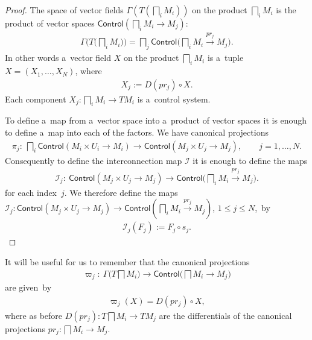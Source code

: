 \documentclass[pdftex]{sigma}
\numberwithin{equation}{section}
\begin{document}
\begin{proof}
The space of vector f\/ields $\Gamma \left(T\left(\bigsqcap_i M_i\right)\right)$ on the product $\bigsqcap_i M_i$ is the product of vector
spaces $\mathsf{Control} (\bigsqcap_i M_i \to M_j)$:
\begin{gather*}
\Gamma \bigg(T\bigg(\bigsqcap_i M_i\bigg)\bigg) = \bigsqcap_j \mathsf{Control} \bigg(\bigsqcap_i M_i \xrightarrow{pr_j}M_j\bigg).
\end{gather*}
In other words a~vector f\/ield $X $ on the product $\bigsqcap_i M_i$ is a~tuple $X = (X_1, \ldots, X_N)$, where
\begin{gather*}
X_j:= D (pr_j)\circ X.
\end{gather*}
Each component $X_j \colon \bigsqcap_i M_i \to TM_i$ is a~control system.

To def\/ine a~map from a~vector space into a~product of vector spaces it is enough to def\/ine a~map into each of the factors.
We have canonical projections
\begin{gather*}
\pi_j\colon \ \bigsqcap_i \mathsf{Control}(M_i\times U_i \to M_i) \to \mathsf{Control}(M_j\times U_j\to M_j),
\qquad
j=1,\ldots, N.
\end{gather*}
Consequently to def\/ine the interconnection map $\mathscr{I}$ it is enough to def\/ine the maps
\begin{gather*}
\mathscr{I}_j\colon \ \mathsf{Control}(M_j\times U_j\to M_j) \to \mathsf{Control} \bigg(\bigsqcap_i M_i \xrightarrow {pr_j}M_j\bigg).
\end{gather*}
for each index~$j$.
We therefore def\/ine the maps $\mathscr{I}_j\colon \mathsf{Control}(M_j\times U_j\to M_j) \to \mathsf{Control}
(\bigsqcap_i M_i \xrightarrow {pr_j} M_j)$, $1\leq j\leq N$,~by
\begin{gather*}
\mathscr{I}_j (F_j):= F_j \circ s_j. \tag*{\qed}
\end{gather*}
\renewcommand{\qed}{}
\end{proof}

\begin{Remark}
\label{rmrk:2.21}
It will be useful for us to remember that the canonical projections
\begin{gather*}
\varpi_j\colon \ \Gamma \Big(T\bigsqcap M_i\Big)
\to \mathsf{Control} \Big(\bigsqcap M_i \to M_j\Big)
\end{gather*}
are given~by
\begin{gather*}
\varpi_j (X) = D (pr_j)\circ X,
\end{gather*}
where as before $D (pr_j)\colon T \bigsqcap M_i \to TM_j$ are the dif\/ferentials of the canonical projections $pr_j\colon\bigsqcap M_i \to M_j$.
\end{Remark}
\end{document}
